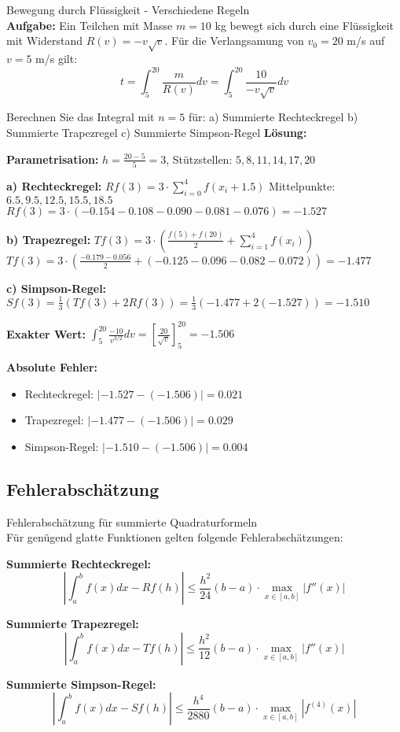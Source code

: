 \begin{example2}{Bewegung durch Flüssigkeit - Verschiedene Regeln}\\
\textbf{Aufgabe:} Ein Teilchen mit Masse $m = 10$ kg bewegt sich durch eine Flüssigkeit mit Widerstand $R(v) = -v\sqrt{v}$. Für die Verlangsamung von $v_0 = 20$ m/s auf $v = 5$ m/s gilt:
$$t = \int_5^{20} \frac{m}{R(v)} dv = \int_5^{20} \frac{10}{-v\sqrt{v}} dv$$

Berechnen Sie das Integral mit $n = 5$ für:
a) Summierte Rechteckregel
b) Summierte Trapezregel  
c) Summierte Simpson-Regel
\tcblower
\textbf{Lösung:}

\textbf{Parametrisation:} $h = \frac{20-5}{5} = 3$, Stützstellen: $5, 8, 11, 14, 17, 20$

\textbf{a) Rechteckregel:} $Rf(3) = 3 \cdot \sum_{i=0}^{4} f(x_i + 1.5)$
Mittelpunkte: $6.5, 9.5, 12.5, 15.5, 18.5$
$Rf(3) = 3 \cdot (-0.154 - 0.108 - 0.090 - 0.081 - 0.076) = -1.527$

\textbf{b) Trapezregel:} $Tf(3) = 3 \cdot \left(\frac{f(5) + f(20)}{2} + \sum_{i=1}^{4} f(x_i)\right)$
$Tf(3) = 3 \cdot \left(\frac{-0.179 - 0.056}{2} + (-0.125 - 0.096 - 0.082 - 0.072)\right) = -1.477$

\textbf{c) Simpson-Regel:} $Sf(3) = \frac{1}{3}(Tf(3) + 2Rf(3)) = \frac{1}{3}(-1.477 + 2(-1.527)) = -1.510$

\textbf{Exakter Wert:} $\int_5^{20} \frac{-10}{v^{3/2}} dv = \left[\frac{20}{\sqrt{v}}\right]_5^{20} = -1.506$

\textbf{Absolute Fehler:}
\begin{itemize}
    \item Rechteckregel: $|{-1.527} - ({-1.506})| = 0.021$
    \item Trapezregel: $|{-1.477} - ({-1.506})| = 0.029$  
    \item Simpson-Regel: $|{-1.510} - ({-1.506})| = 0.004$
\end{itemize}
\end{example2}

\subsection{Fehlerabschätzung}

\begin{theorem}{Fehlerabschätzung für summierte Quadraturformeln}\\
Für genügend glatte Funktionen gelten folgende Fehlerabschätzungen:

\textbf{Summierte Rechteckregel:}
$$\left|\int_a^b f(x) dx - Rf(h)\right| \leq \frac{h^2}{24}(b-a) \cdot \max_{x \in [a,b]} |f''(x)|$$

\textbf{Summierte Trapezregel:}
$$\left|\int_a^b f(x) dx - Tf(h)\right| \leq \frac{h^2}{12}(b-a) \cdot \max_{x \in [a,b]} |f''(x)|$$

\textbf{Summierte Simpson-Regel:}
$$\left|\int_a^b f(x) dx - Sf(h)\right| \leq \frac{h^4}{2880}(b-a) \cdot \max_{x \in [a,b]} |f^{(4)}(x)|$$
\end{theorem}

